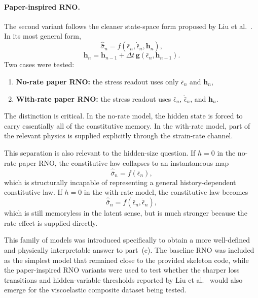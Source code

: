 \documentclass[11pt,a4paper, onecolumn]{article}
\newcommand{\epsbar}{\bar{\epsilon}}
\newcommand{\sigbar}{\bar{\sigma}}
\newcommand{\dt}{\Delta t}
\begin{document}
\paragraph{Paper-inspired RNO.}
The second variant follows the cleaner state-space form proposed by Liu et al.~\cite{Liu_2023}. In its most general form,
\begin{equation}
\hat{\sigbar}_n=f\!\left(\epsbar_n,\dot{\epsbar}_n,\bm{h}_{n}\right),
\label{eq:paper_stress_relation}
\end{equation}
\begin{equation}
\bm{h}_{n}=\bm{h}_{n-1}+\dt\,\bm{g}\!\left(\epsbar_n,\bm{h}_{n-1}\right).
\label{eq:paper_kinetic_relation}
\end{equation}
Two cases were tested:
\begin{enumerate}[leftmargin=1.5em]
    \item \textbf{No-rate paper RNO:} the stress readout uses only $\epsbar_n$ and $\bm{h}_n$,
    \item \textbf{With-rate paper RNO:} the stress readout uses $\epsbar_n$, $\dot{\epsbar}_n$, and $\bm{h}_n$.
\end{enumerate}
The distinction is critical. In the no-rate model, the hidden state is forced to carry essentially all of the constitutive memory. In the with-rate model, part of the relevant physics is supplied explicitly through the strain-rate channel.

This separation is also relevant to the hidden-size question. If $h=0$ in the no-rate paper RNO, the constitutive law collapses to an instantaneous map
\begin{equation}
\hat{\sigbar}_n=f\!\left(\epsbar_n\right),
\label{eq:h0_no_rate}
\end{equation}
which is structurally incapable of representing a general history-dependent constitutive law. If $h=0$ in the with-rate model, the constitutive law becomes
\begin{equation}
\hat{\sigbar}_n=f\!\left(\epsbar_n,\dot{\epsbar}_n\right),
\label{eq:h0_with_rate}
\end{equation}
which is still memoryless in the latent sense, but is much stronger because the rate effect is supplied directly.

This family of models was introduced specifically to obtain a more well-defined and physically interpretable answer to part~(c). The baseline RNO was included as the simplest model that remained close to the provided skeleton code, while the paper-inspired RNO variants were used to test whether the sharper loss transitions and hidden-variable thresholds reported by Liu et al.~\cite{Liu_2023} would also emerge for the viscoelastic composite dataset being tested. 
\end{document}
